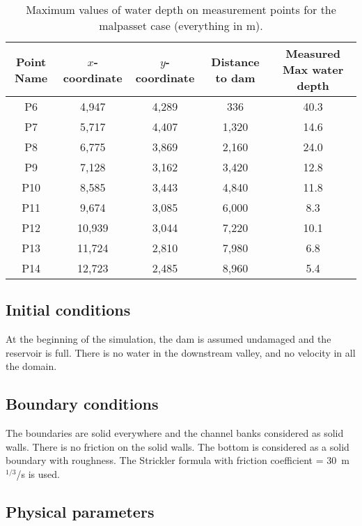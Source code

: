 \begin{table}[H]
  \centering
  \begin{tabular}{|c|c|c|c|c|}
    \hline Point Name & $x$-coordinate & $y$-coordinate & Distance to dam & Measured Max water depth \\
    \hline P6 & 4,947 & 4,289 & 336 & 40.3\\
    P7 & 5,717 & 4,407 & 1,320 & 14.6\\
    P8 & 6,775 & 3,869 & 2,160 & 24.0\\
    P9 & 7,128 & 3,162 & 3,420 & 12.8\\
    P10 & 8,585 & 3,443 & 4,840 & 11.8 \\
    P11 & 9,674 & 3,085 & 6,000 & 8.3\\
    P12 & 10,939 & 3,044 & 7,220 & 10.1\\
    P13 & 11,724 & 2,810 & 7,980 & 6.8 \\
    P14 & 12,723 & 2,485 & 8,960 & 5.4\\
    \hline
  \end{tabular}
  \caption{Maximum values of water depth on measurement points for the malpasset case
  (everything in m).}
  \label{tab:malpasset:MaxMeasures}
\end{table}

\subsection{Initial conditions}
At the beginning of the simulation, the dam is assumed undamaged and the
reservoir is full.
There is no water in the downstream valley, and no velocity in all the domain.
\subsection{Boundary conditions}
The boundaries are solid everywhere and the channel banks considered as solid
walls.
There is no friction on the solid walls.
The bottom is considered as a solid boundary with roughness.
The Strickler formula with friction coefficient = 30~m$^{1/3}$/s is used.

\subsection{Physical parameters}


